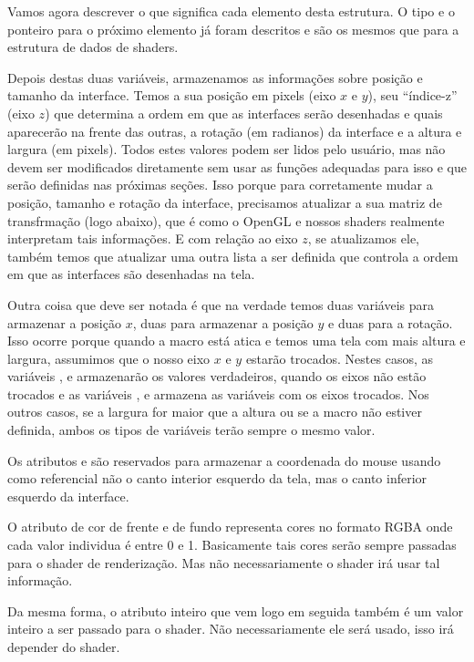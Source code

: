 Vamos agora descrever o que significa cada elemento desta estrutura. O
tipo e o ponteiro para o próximo elemento já foram descritos e são os
mesmos que para a estrutura de dados de shaders.

Depois destas duas variáveis, armazenamos as informações sobre posição
e tamanho da interface. Temos a sua posição em pixels (eixo $x$ e
$y$), seu ``índice-z'' (eixo $z$) que determina a ordem em que as
interfaces serão desenhadas e quais aparecerão na frente das outras, a
rotação (em radianos) da interface e a altura e largura (em
pixels). Todos estes valores podem ser lidos pelo usuário, mas não
devem ser modificados diretamente sem usar as funções adequadas para
isso e que serão definidas nas próximas seções. Isso porque para
corretamente mudar a posição, tamanho e rotação da interface,
precisamos atualizar a sua matriz de transfrmação (logo abaixo), que é
como o OpenGL e nossos shaders realmente interpretam tais
informações. E com relação ao eixo $z$, se atualizamos ele, também
temos que atualizar uma outra lista a ser definida que controla a
ordem em que as interfaces são desenhadas na tela.

Outra coisa que deve ser notada é que na verdade temos duas variáveis
para armazenar a posição $x$, duas para armazenar a posição $y$ e duas
para a rotação. Isso ocorre porque quando a
macro  está atica e temos uma tela com
mais altura e largura, assumimos que o nosso eixo $x$ e $y$ estarão
trocados. Nestes casos, as
variáveis ,  e 
armazenarão os valores verdadeiros, quando os eixos não estão trocados
e as variáveis , 
e  armazena as variáveis com os eixos
trocados. Nos outros casos, se a largura for maior que a altura ou se
a macro não estiver definida, ambos os tipos de variáveis terão sempre
o mesmo valor.

Os atributos  e  são
reservados para armazenar a coordenada do mouse usando como
referencial não o canto interior esquerdo da tela, mas o canto
inferior esquerdo da interface.

O atributo de cor de frente e de fundo representa cores no formato
RGBA onde cada valor individua é entre 0 e 1. Basicamente tais cores
serão sempre passadas para o shader de renderização. Mas não
necessariamente o shader irá usar tal informação.

Da mesma forma, o atributo inteiro que vem logo em seguida também é um
valor inteiro a ser passado para o shader. Não necessariamente ele
será usado, isso irá depender do shader.

